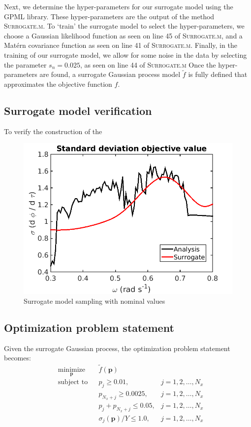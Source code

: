 \documentclass[11pt]{article}
\newcommand{\bs}[1] {\boldsymbol{#1}}
\begin{document}
Next, we determine the hyper-parameters for our surrogate
model using the \textsc{GPML} library. These hyper-parameters
are the output of the method \textsc{Surrogate.m}. To `train'
the surrogate model to select the hyper-parameters, we
choose a Gaussian likelihood function as seen on line
45 of \textsc{Surrogate.m}, and a Mat\'{e}rn covariance
function as seen on line 41 of \textsc{Surrogate.m}.
Finally, in the training of our surrogate model, we allow
for some noise in the data by selecting the parameter
$s_n = 0.025$, as seen on line 44 of \textsc{Surrogate.m}
Once the hyper-parameters are found, a surrogate Gaussian
process model $\tilde{f}$ is fully defined that
approximates the objective function $f$.

\subsection{Surrogate model verification}

To verify the construction of the

\begin{figure}[hbt!]
\centering
\includegraphics[width=.5\linewidth]{Verify2}
\caption{Surrogate model sampling with nominal values}
\label{fig:surrogate}
\end{figure}

\subsection{Optimization problem statement}

Given the surrogate Gaussian process, the optimization
problem statement becomes:
\begin{equation}
\begin{aligned}
& \underset{\bs{p}}{\text{minimize}}
& & \tilde{f}(\bs{p}) \\
& \text{subject to}
& & p_j \geq 0.01,                    &j=1,2,\dots,N_x \\
&&& p_{N_x+j} \geq 0.0025,            &j=1,2,\dots,N_x\\
&&& p_j + p_{N_x +j} \leq 0.05,       &j=1,2,\dots,N_x \\
&&& \sigma_j(\bs{p})/Y \leq 1.0,      &j=1,2,\dots,N_x
\end{aligned}
\end{equation}
\end{document}
